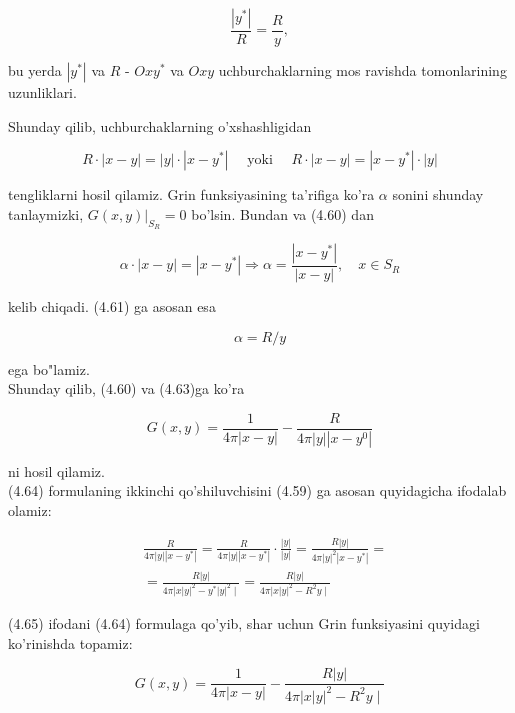 \documentclass[10pt]{article}
\begin{document}
$$
\frac{\left|y^{*}\right|}{R}=\frac{R}{y},
$$

bu yerda $\left|y^{*}\right|$ va $R$ - $O x y^{*}$ va $O x y$ uchburchaklarning mos ravishda tomonlarining uzunliklari.

Shunday qilib, uchburchaklarning o'xshashligidan


\begin{equation*}
R \cdot|x-y|=|y| \cdot\left|x-y^{*}\right| \quad \text { yoki } \quad R \cdot|x-y|=\left|x-y^{*}\right| \cdot|y| \tag{4.61}
\end{equation*}


tengliklarni hosil qilamiz. Grin funksiyasining ta'rifiga ko'ra $\alpha$ sonini shunday tanlaymizki, $\left.G(x, y)\right|_{S_{R}}=0$ bo'lsin. Bundan va (4.60) dan


\begin{equation*}
\alpha \cdot|x-y|=\left|x-y^{*}\right| \Rightarrow \alpha=\frac{\left|x-y^{*}\right|}{|x-y|}, \quad x \in S_{R} \tag{4.62}
\end{equation*}


kelib chiqadi. (4.61) ga asosan esa


\begin{equation*}
\alpha=R / y \tag{4.63}
\end{equation*}


ega bo"lamiz.\\
Shunday qilib, (4.60) va (4.63)ga ko'ra


\begin{equation*}
G(x, y)=\frac{1}{4 \pi|x-y|}-\frac{R}{4 \pi|y|\left|x-y^{0}\right|} \tag{4.64}
\end{equation*}


ni hosil qilamiz.\\
(4.64) formulaning ikkinchi qo'shiluvchisini (4.59) ga asosan quyidagicha ifodalab olamiz:


\begin{align*}
& \frac{R}{4 \pi|y|\left|x-y^{*}\right|}=\frac{R}{4 \pi|y|\left|x-y^{*}\right|} \cdot \frac{|y|}{|y|}=\frac{R|y|}{4 \pi|y|^{2}\left|x-y^{*}\right|}= \\
& =\frac{R|y|}{\left.4 \pi|x| y\right|^{2}-y^{*}|y|^{2} \mid}=\frac{R|y|}{\left.4 \pi|x| y\right|^{2}-R^{2} y \mid} \tag{4.65}
\end{align*}


(4.65) ifodani (4.64) formulaga qo'yib, shar uchun Grin funksiyasini quyidagi ko'rinishda topamiz:


\begin{equation*}
G(x, y)=\frac{1}{4 \pi|x-y|}-\frac{R|y|}{\left.4 \pi|x| y\right|^{2}-R^{2} y \mid} \tag{4,66}
\end{equation*}
\end{document}

